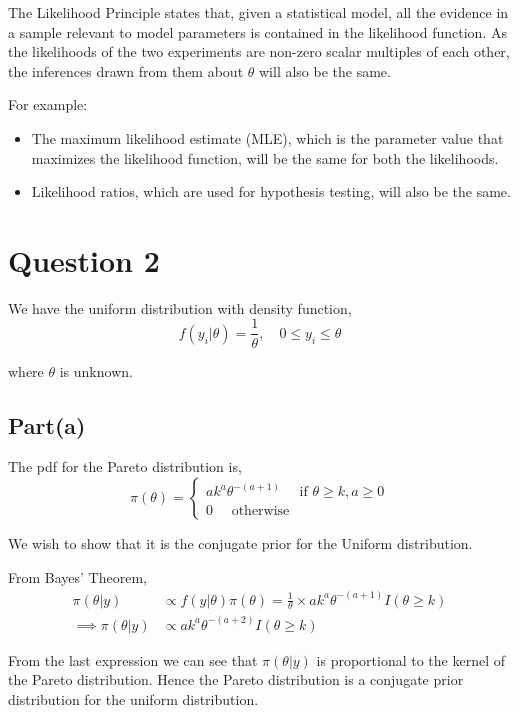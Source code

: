 \documentclass[a4paper]{article}
\begin{document}
The Likelihood Principle states that, given a statistical model, all the evidence in a sample relevant to model parameters is contained in the likelihood function. As the likelihoods of the two experiments are non-zero scalar multiples of each other, the inferences drawn from them about $\theta$ will also be the same.

For example:
\begin{itemize}
    \item The maximum likelihood estimate (MLE), which is the parameter value that maximizes the likelihood function, will be the same for both the likelihoods.
    \item Likelihood ratios, which are used for hypothesis testing, will also be the same.
\end{itemize}

\newpage

\section*{Question 2}

We have the uniform distribution with density function,
\[f(y_i|\theta) = \frac{1}{\theta}, \quad 0 \leq y_i \leq \theta \]

where \(\theta\) is unknown.

\subsection*{Part(a)}

The pdf for the Pareto distribution is,
\[\displaystyle
    \pi(\theta) = \begin{cases}
        a k^{a} \theta^{-(a+1)} \quad \text{ if } \theta \geq k, a \geq 0\\
        0 \quad \text{ otherwise }
    \end{cases}
\]

We wish to show that it is the conjugate prior for the Uniform distribution.

From Bayes' Theorem,
\begin{align*}
    \pi(\theta|y) &\propto f(y|\theta) \pi(\theta) 
                = \frac{1}{\theta} \times a k^{a} \theta^{-(a+1)} I(\theta \geq k) \\
    \implies \pi(\theta|y) &\propto a k^{a} \theta^{-(a+2)} I(\theta \geq k)
\end{align*}

From the last expression we can see that \(\pi(\theta|y)\) is proportional to the kernel of the Pareto distribution. Hence the Pareto distribution is a conjugate prior distribution for the uniform distribution.
\end{document}
